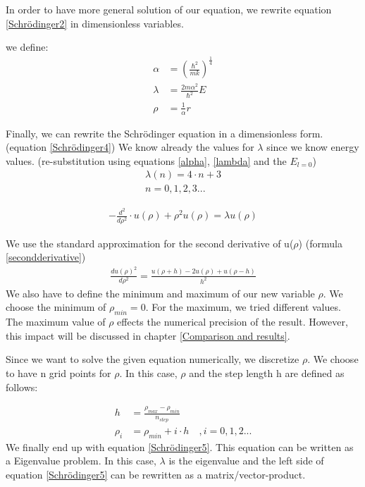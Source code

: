 \documentclass[10pt,a4paper]{article}
\begin{document}
In order to have more general solution of our equation, we rewrite equation \ref{Schrödinger2} in dimensionless variables. 

we define:
\begin{align}
	\alpha&= \left(\frac{\hbar^2}{mk}\right)^{\frac{1}{4}} \\ \label{alpha}
	\lambda&=\frac{2m\alpha^2}{\hbar^2}E \\ \label{lambda}
	\rho&= \frac{1}{\alpha} r
\end{align}

Finally, we can rewrite the Schrödinger equation in a dimensionless form. (equation \ref{Schrödinger4}) We know already the values for $\lambda$ since we know energy values. (re-substitution using equations \ref{alpha}, \ref{lambda} and the $E_{l=0}$)
\begin{align}
	\lambda(n)= 4 \cdot n +3 \\
	n=0,1,2,3...
\end{align}

\begin{align}
	-\frac{d^2}{d \rho^2} \cdot u(\rho) + \rho^2 u( \rho ) = \lambda u(\rho) \label{Schrödinger4}
\end{align}

We use the standard approximation for the second derivative of u($\rho$) (formula \ref{secondderivative})
\begin{align}
	\frac{du(\rho)^2}{d \rho^2}= \frac{u(\rho+h)-2u(\rho)+u(\rho-h)}{h^2} \label{secondderivative}
\end{align}
We also have to define the minimum and maximum of our new variable $\rho$. We choose the minimum of $\rho_{min}=0$. For the maximum, we tried different values. The maximum value of $\rho$ effects the numerical precision of the result. However, this impact will be discussed in chapter \ref{Comparison and results}.

Since we want to solve the given equation numerically, we discretize $\rho$. We choose to have n grid points for $\rho$. In this case, $\rho$ and the step length h are defined as follows:

\begin{align}
	h &=\frac{\rho_{max}-\rho_{min}}{n_{step}}\\
	\rho_i &= \rho_{min}+i \cdot h \quad, i=0,1,2...
\end{align}
We finally end up with equation \ref{Schrödinger5}. This equation can be written as a Eigenvalue problem. In this case, $\lambda$ is the eigenvalue and the left side of equation \ref{Schrödinger5} can be rewritten as a matrix/vector-product.
\end{document}
